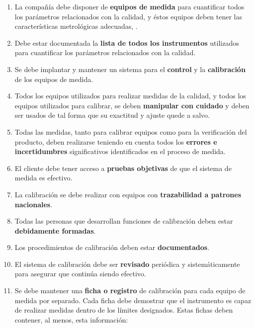 \begin{enumerate}


\item
La compañía debe disponer de \textbf{equipos de medida} para cuantificar todos los parámetros relacionados con la calidad, y éstos equipos deben tener las características metrológicas adecuadas, \parencite{lope1998instrumentos}.

\item
Debe estar documentada la \textbf{lista de todos los instrumentos} utilizados para cuantificar los parámetros relacionados con la calidad.

\item
Se debe implantar y mantener un sistema para el \textbf{control} y la \textbf{calibración} de los equipos de medida.

\item
Todos los equipos utilizados para realizar medidas de la calidad, y todos los equipos utilizados para calibrar, se deben \textbf{manipular con cuidado} y deben ser usados de tal forma que su exactitud y ajuste quede a salvo.

\item
Todas las medidas, tanto para calibrar equipos como para la verificación del producto, deben realizarse teniendo en cuenta todos los \textbf{errores e incertidumbres} significativos identificados en el proceso de medida.

\item
El cliente debe tener acceso a \textbf{pruebas objetivas} de que el sistema de medida es efectivo.

\item
La calibración se debe realizar con equipos con \textbf{trazabilidad a patrones nacionales}.

\item
Todas las personas que desarrollan funciones de calibración deben estar \textbf{debidamente formadas}.

\item
Los procedimientos de calibración deben estar \textbf{documentados}.

\item
El sistema de calibración debe ser \textbf{revisado} periódica y sistemáticamente para asegurar que continúa siendo efectivo.

\item
Se debe mantener una \textbf{ficha o registro} de calibración para cada equipo de medida por separado. Cada ficha debe demostrar que el instrumento es capaz de realizar medidas dentro de los límites designados. Estas fichas deben contener, al menos, esta información:
	

\end{enumerate}
